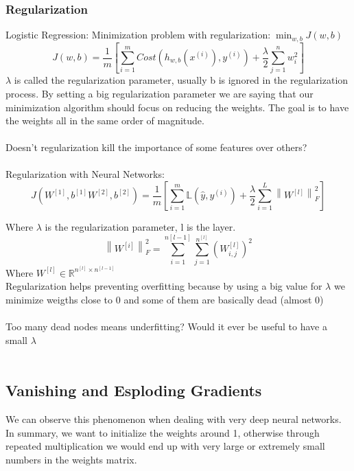 \documentclass{article}
\newcommand{\norm}[1]{\left\lVert#1\right\rVert}
\begin{document}
\subsubsection{Regularization}
Logistic Regression: Minimization problem with regularization:$ \;\min_{w,b}{J(w,b)}$
$$J(w,b)= \frac{1}{m}\left[ \sum_{i=1}^{m}{Cost(h_{w,b}(x^{(i)}), y^{(i)})+\frac{\lambda}{2}\sum_{j=1}^{n}{w_i^2}} \right]$$
$\lambda$ is called the regularization parameter, usually b is ignored in the regularization process.
By setting a big regularization parameter we are saying that our minimization algorithm should focus on reducing the weights. The goal is to have the weights all in the same order of magnitude.\\\\
Doesn't regularization kill the importance of some features over others?\\\\
Regularization with Neural Networks:\\
$$J(W^{[1]}, b^{[1]}W^{[2]}, b^{[2]})= \frac{1}{m}\left[ \sum_{i=1}^{m}{\mathbb{L}(\hat{y}, y^{(i)})+\frac{\lambda}{2}\sum_{i=1}^{L}{\norm{W^{[l]}}^2_F}} \right]$$

Where $\lambda$ is the regularization parameter, l is the layer. $$\norm{W^{[i]}}^2_F=\sum_{i=1}^{n{[l-1]}}{\sum_{j=1}^{n^{[l]}}{(W_{i,j}^{[l]})^2}}$$
Where $W^{[l]}\in \mathbb{R}^{n^{[l]}\times n^{[l-1]}}$\\
Regularization helps preventing overfitting because by using a big value for $\lambda$ we minimize weigths close to 0 and some of them are basically dead (almost 0)\\\\
Too many dead nodes means underfitting? Would it ever be useful to have a small $\lambda$\\\\

\subsection*{Vanishing and Esploding Gradients}
We can observe this phenomenon when dealing with very deep neural networks. In summary, we want to initialize the weights around 1, otherwise through repeated multiplication we would end up with very large or extremely small numbers in the weights matrix. 
\end{document}
